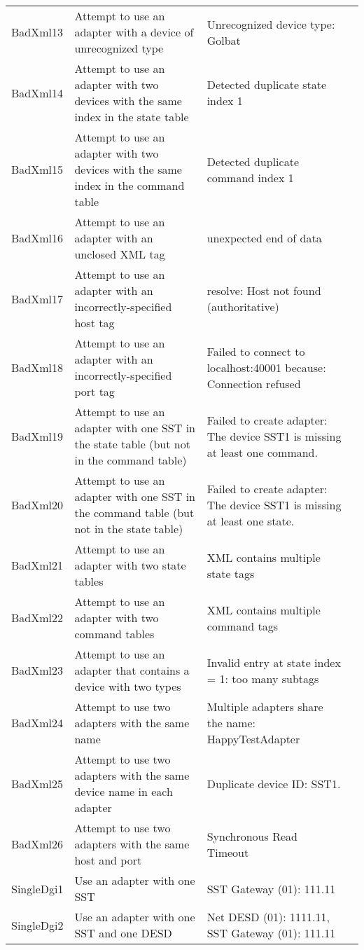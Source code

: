 \documentclass{article}
\begin{document}
\begin{center}
\begin{footnotesize}
\begin{longtable}{|p{3cm}|p{7cm}|p{7cm}|c|}
    BadXml13 & Attempt to use an adapter with a device of unrecognized type & Unrecognized device type: Golbat & \\
    BadXml14 & Attempt to use an adapter with two devices with the same index in the state table & Detected duplicate state index 1 & \\
    BadXml15 & Attempt to use an adapter with two devices with the same index in the command table & Detected duplicate command index 1 & \\
    BadXml16 & Attempt to use an adapter with an unclosed XML tag & unexpected end of data & \\
    BadXml17 & Attempt to use an adapter with an incorrectly-specified host tag & resolve: Host not found (authoritative) & \\
    BadXml18 & Attempt to use an adapter with an incorrectly-specified port tag & Failed to connect to localhost:40001 because: Connection refused & \\
    BadXml19 & Attempt to use an adapter with one SST in the state table (but not in the command table) & Failed to create adapter: The device SST1 is missing at least one command. & \\
    BadXml20 & Attempt to use an adapter with one SST in the command table (but not in the state table) & Failed to create adapter: The device SST1 is missing at least one state. & \\
    BadXml21 & Attempt to use an adapter with two state tables & XML contains multiple state tags & \\
    BadXml22 & Attempt to use an adapter with two command tables & XML contains multiple command tags & \\
    BadXml23 & Attempt to use an adapter that contains a device with two types & Invalid entry at state index = 1: too many subtags & \\
    BadXml24 & Attempt to use two adapters with the same name & Multiple adapters share the name: HappyTestAdapter & \\
    BadXml25 & Attempt to use two adapters with the same device name in each adapter & Duplicate device ID: SST1. & \\
    BadXml26 & Attempt to use two adapters with the same host and port & Synchronous Read Timeout & \\
    SingleDgi1 & Use an adapter with one SST & SST Gateway (01): 111.11 & \\
    SingleDgi2 & Use an adapter with one SST and one DESD & Net DESD (01): 1111.11, SST Gateway (01): 111.11 & \\

\end{longtable}
\end{footnotesize}
\end{center}
\end{document}

